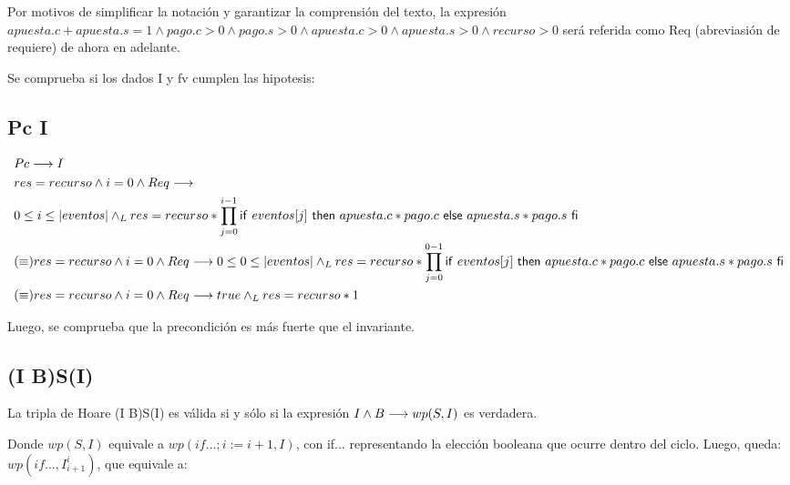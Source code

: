 \documentclass[10pt,a4paper]{article}
\begin{document}
 Por motivos de simplificar la notación y garantizar la comprensión del texto, la expresión
 $apuesta.c + apuesta.s = 1 \land pago.c > 0 \land pago.s > 0 \land apuesta.c > 0 \land apuesta.s > 0 \land recurso > 0$
 será referida como Req (abreviasión de requiere) de ahora en adelante.
 
\vspace{0.3cm}

 Se comprueba si los dados I y fv cumplen las hipotesis:

\subsection{Pc \implica I}

\begin{equation} %
\begin{split} 
	& Pc \implica I \\
	& res = recurso \land i = 0 \land Req  \implica \\
	& 0 \leq i \leq \longitud{eventos} \yLuego 
	res = recurso * \prod\limits_{j=0}^{i-1} \IfThenElse{eventos[j]}{apuesta.c * pago.c}{apuesta.s * pago.s}\\

	& (\equiv) res = recurso \land i = 0 \land Req \implica 
	0 \leq 0 \leq \longitud{eventos} \yLuego res = recurso * \prod\limits_{j=0}^{0-1} \IfThenElse{eventos[j]}{apuesta.c * pago.c}{apuesta.s * pago.s}\\

	& (\equiv) res = recurso \land i = 0 \land Req \implica 
	true \yLuego res = recurso * 1
\end{split} 
\end{equation}

 Luego, se comprueba que la precondición es más fuerte que el invariante.

\subsection{(I \land B)S(I)}

 La tripla de Hoare (I \land B)S(I) es válida si y sólo si la expresión $I \land B \longrightarrow wp(S,I)$ es verdadera.

\vspace{0.3cm}

 Donde $wp(S,I)$ equivale a $wp(if...; i:= i + 1, I)$, con if... representando la elección booleana que ocurre dentro del ciclo.
 Luego, queda: $wp(if..., I^{i}_{i+1})$, que equivale a:
\end{document}
